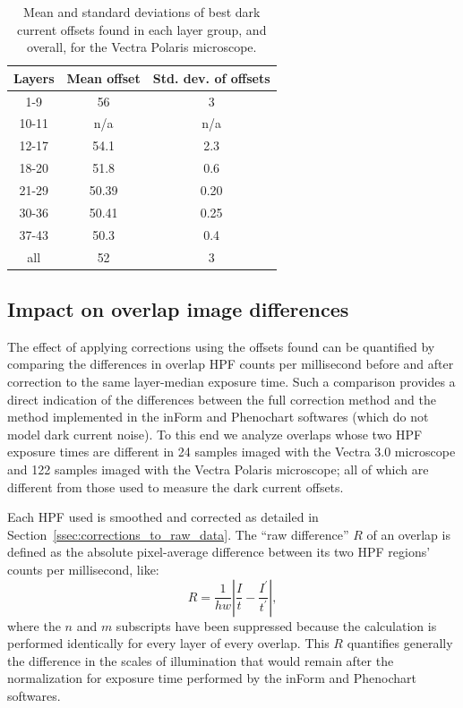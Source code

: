 \documentclass[letterpaper,11pt]{article}
\newcommand{\refsec}[1]{Section~\ref{#1}}
\begin{document}
\begin{table}[!htb]
\centering
\begin{tabular}{c c c}
Layers & Mean offset & Std. dev. of offsets \\
\hline \hline
1-9    & 56          & 3    \\      
10-11  & n/a         & n/a  \\
12-17  & 54.1        & 2.3  \\
18-20  & 51.8        & 0.6  \\
21-29  & 50.39       & 0.20 \\
30-36  & 50.41       & 0.25 \\
37-43  & 50.3        & 0.4  \\
\hline
all    & 52          & 3    \\
\hline \hline
\end{tabular}
\caption{\footnotesize Mean and standard deviations of best dark current offsets found in each layer group, and overall, for the Vectra Polaris microscope.}
\label{tab:layer_group_means_stds_polaris}
\end{table}

\clearpage

\subsection{Impact on overlap image differences}
\label{ssec:impact_on_overlap_image_differences}

The effect of applying corrections using the offsets found can be quantified by comparing the differences in overlap HPF counts per millisecond before and after correction to the same layer-median exposure time. Such a comparison provides a direct indication of the differences between the full correction method and the method implemented in the inForm and Phenochart softwares (which do not model dark current noise). To this end we analyze overlaps whose two HPF exposure times are different in 24 samples imaged with the Vectra 3.0 microscope and 122 samples imaged with the Vectra Polaris microscope; all of which are different from those used to measure the dark current offsets.  

Each HPF used is smoothed and corrected as detailed in \refsec{ssec:corrections_to_raw_data}. The ``raw difference'' $R$ of an overlap is defined as the absolute pixel-average difference between its two HPF regions' counts per millisecond, like:
\begin{equation}
R = \frac{1}{hw} \left| \frac{I}{t} - \frac{I^{\prime}}{t^{\prime}} \right| ,
\end{equation} 
where the $n$ and $m$ subscripts have been suppressed because the calculation is performed identically for every layer of every overlap. This $R$ quantifies generally the difference in the scales of illumination that would remain after the normalization for exposure time performed by the inForm and Phenochart softwares. 
\end{document}
